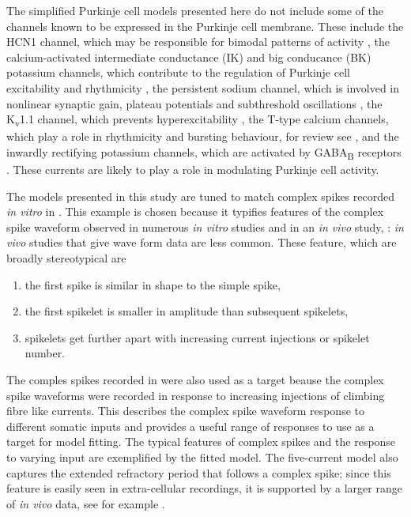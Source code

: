 \documentclass[utf8]{frontiersSCNS} %
\begin{document}
The simplified Purkinje cell models presented here do not include some
of the channels known to be expressed in the Purkinje cell
membrane. These include the HCN1 channel, which may be responsible for
bimodal patterns of activity \cite{LoewensteinEtAl2005}, the
calcium-activated intermediate conductance (IK) and big conducance
(BK) potassium channels, which contribute to the regulation of
Purkinje cell excitability and rhythmicity \cite{CheronEtAl2009}, the
persistent sodium channel, which is involved in nonlinear synaptic
gain, plateau potentials and subthreshold oscillations
\cite{KayEtAl1998}, the K\textsubscript{v}1.1 channel, which prevents
hyperexcitability \cite{ZhangEtAl1999}, the T-type calcium channels,
which play a role in rhythmicity and bursting behaviour, for review
see \cite{CainSnutch2010}, and the inwardly rectifying potassium
channels, which are activated by GABA\textsubscript{B} receptors
\cite{TabataEtAl2005}. These currents are likely to play a role in
modulating Purkinje cell activity.




The models presented in this study are tuned to match complex spikes
recorded \textsl{in vitro} in \cite{DavieEtAl2008}. This example is
chosen because it typifies features of the complex spike
waveform observed in numerous \textsl{in vitro} studies
\cite{ZaghaEtAl2008, zhang2017ethanol, MonsivaisEtAl2005,
  khaliq2005axonal} and in an \textsl{in vivo} study, \cite{WarnaarEtAl2015}:
\textsl{in vivo} studies that give wave form data are less common. These feature, which are broadly
stereotypical are
\begin{enumerate}
\item the first spike is similar in shape to the simple spike,
\item the first spikelet is smaller in amplitude than subsequent spikelets,
\item spikelets get further apart with increasing current injections or spikelet number.
\end{enumerate}
The comples spikes recorded in \cite{DavieEtAl2008} were also used as
a target beause the complex spike waveforms were recorded in response
to increasing injections of climbing fibre like currents. This
describes the complex spike waveform response to different somatic
inputs and provides a useful range of responses to use as a target for
model fitting. The typical features of complex spikes and the response
to varying input are exemplified by the fitted model. The five-current
model also captures the extended refractory period that follows a
complex spike; since this feature is easily seen in extra-cellular
recordings, it is supported by a larger range of \textsl{in vivo}
data, see for example
\cite{GranitPhillips1956,LathamPaul1970,BloedelRoberts1971,ArmstrongRawson1979,BausweinEtAl1983,SatoEtAl1992,
  BurroughsEtAl2016}.
\end{document}
